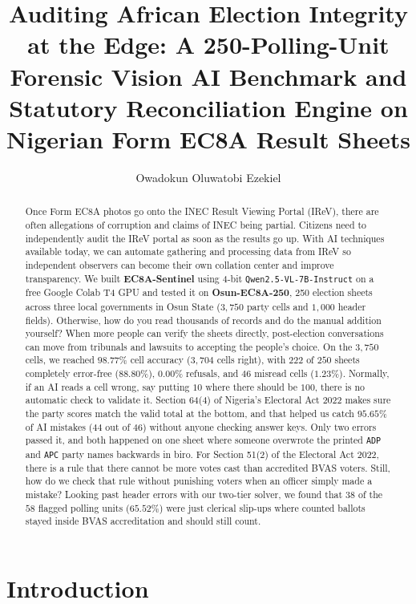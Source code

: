\documentclass{article}
\title{Auditing African Election Integrity at the Edge: A 250-Polling-Unit Forensic Vision AI Benchmark and Statutory Reconciliation Engine on Nigerian Form EC8A Result Sheets}
\author{Owadokun Oluwatobi Ezekiel}
\date{}
\begin{document}
\maketitle

\begin{abstract}
Once Form EC8A photos go onto the INEC Result Viewing Portal (IReV), there are often allegations of corruption and claims of INEC being partial. Citizens need to independently audit the IReV portal as soon as the results go up. With AI techniques available today, we can automate gathering and processing data from IReV so independent observers can become their own collation center and improve transparency. We built \textbf{EC8A-Sentinel} using 4-bit \texttt{Qwen2.5-VL-7B-Instruct} on a free Google Colab T4 GPU and tested it on \textbf{Osun-EC8A-250}, 250 election sheets across three local governments in Osun State ($3,750$ party cells and $1,000$ header fields). Otherwise, how do you read thousands of records and do the manual addition yourself? When more people can verify the sheets directly, post-election conversations can move from tribunals and lawsuits to accepting the people's choice. On the $3,750$ cells, we reached $98.77\%$ cell accuracy ($3,704$ cells right), with $222$ of $250$ sheets completely error-free ($88.80\%$), $0.00\%$ refusals, and $46$ misread cells ($1.23\%$). Normally, if an AI reads a cell wrong, say putting $10$ where there should be $100$, there is no automatic check to validate it. Section 64(4) of Nigeria's Electoral Act 2022 makes sure the party scores match the valid total at the bottom, and that helped us catch $95.65\%$ of AI mistakes ($44$ out of $46$) without anyone checking answer keys. Only two errors passed it, and both happened on one sheet where someone overwrote the printed \texttt{ADP} and \texttt{APC} party names backwards in biro. For Section 51(2) of the Electoral Act 2022, there is a rule that there cannot be more votes cast than accredited BVAS voters. Still, how do we check that rule without punishing voters when an officer simply made a mistake? Looking past header errors with our two-tier solver, we found that $38$ of the $58$ flagged polling units ($65.52\%$) were just clerical slip-ups where counted ballots stayed inside BVAS accreditation and should still count.
\end{abstract}

\section{Introduction}
\end{document}
